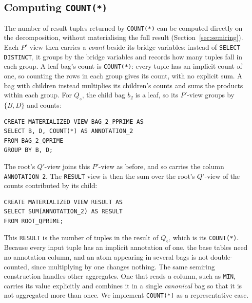\subsection{Computing \texttt{COUNT(*)}}

The number of result tuples returned by \texttt{COUNT(*)} can be computed directly on the decomposition, without materialising the full result (Section~\ref{sec:semiring}).
Each $P'$-view then carries a \emph{count} beside its bridge variables: instead of \texttt{SELECT DISTINCT}, it groups by the bridge variables and records how many tuples fall in each group.
A leaf bag's count is \texttt{COUNT(*)}: every tuple has an implicit count of one, so counting the rows in each group gives its count, with no explicit sum.
A bag with children instead multiplies its children's counts and sums the products within each group.
For $Q_\diamond$, the child bag $b_2$ is a leaf, so its $P'$-view groups by $\{B,D\}$ and counts:

\begin{lstlisting}[caption={The $P'$-view of the child bag, carrying a count.}]
CREATE MATERIALIZED VIEW BAG_2_PPRIME AS
SELECT B, D, COUNT(*) AS ANNOTATION_2
FROM BAG_2_QPRIME
GROUP BY B, D;
\end{lstlisting}

The root's $Q'$-view joins this $P'$-view as before, and so carries the column \texttt{ANNOTATION\_2}.
The \texttt{RESULT} view is then the sum over the root's $Q'$-view of the counts contributed by its child:

\begin{lstlisting}[caption={The \texttt{RESULT} view computing \texttt{COUNT(*)}.}]
CREATE MATERIALIZED VIEW RESULT AS
SELECT SUM(ANNOTATION_2) AS RESULT
FROM ROOT_QPRIME;
\end{lstlisting}

This \texttt{RESULT} is the number of tuples in the result of $Q_\diamond$, which is its \texttt{COUNT(*)}.
Because every input tuple has an implicit annotation of one, the base tables need no annotation column, and an atom appearing in several bags is not double-counted, since multiplying by one changes nothing.
The same semiring construction handles other aggregates. One that reads a column, such as \texttt{MIN}, carries its value explicitly and combines it in a single \emph{canonical} bag so that it is not aggregated more than once. We implement \texttt{COUNT(*)} as a representative case.

\medskip

